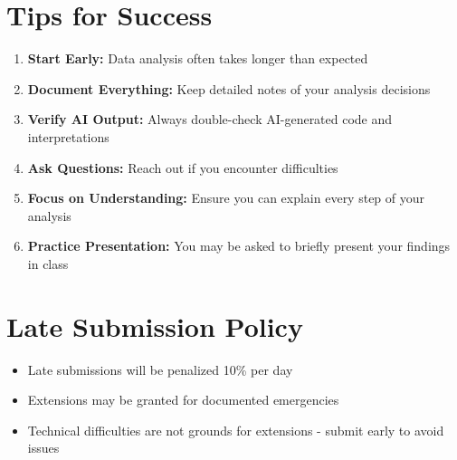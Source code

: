 \documentclass[11pt]{article}
\begin{document}
\section{Tips for Success}

\begin{enumerate}
\item \textbf{Start Early:} Data analysis often takes longer than expected
\item \textbf{Document Everything:} Keep detailed notes of your analysis decisions
\item \textbf{Verify AI Output:} Always double-check AI-generated code and interpretations
\item \textbf{Ask Questions:} Reach out if you encounter difficulties
\item \textbf{Focus on Understanding:} Ensure you can explain every step of your analysis
\item \textbf{Practice Presentation:} You may be asked to briefly present your findings in class
\end{enumerate}

\section{Late Submission Policy}

\begin{itemize}
\item Late submissions will be penalized 10\% per day
\item Extensions may be granted for documented emergencies
\item Technical difficulties are not grounds for extensions - submit early to avoid issues
\end{itemize}
\end{document}

